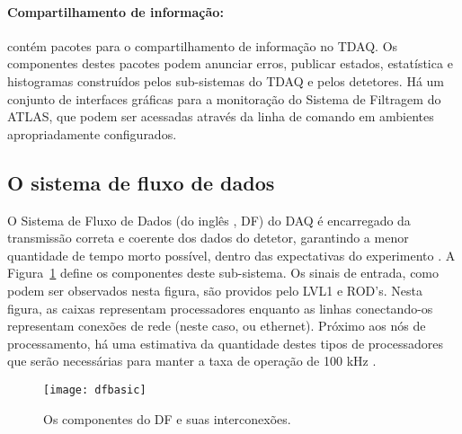 \paragraph{Compartilhamento de informação:} contém pacotes para o
compartilhamento de informação no TDAQ. Os componentes destes pacotes podem
anunciar erros, publicar estados, estatística e histogramas construídos pelos
sub-sistemas do TDAQ e pelos detetores. Há um conjunto de interfaces gráficas
para a monitoração do Sistema de Filtragem do ATLAS, que podem ser acessadas
através da linha de comando em ambientes apropriadamente configurados.



\subsection{O sistema de fluxo de dados}
\label{sec:dataflow}

O Sistema de Fluxo de Dados (do inglês , DF) do DAQ é
encarregado da transmissão correta e coerente dos dados do detetor, garantindo
a menor quantidade de tempo morto possível, dentro das expectativas do
experimento \cite{aa:chep-2003-2, aa:rt-2003, aa:tns-2004-3}. A
Figura~\ref{fig:dfbasic} define os componentes deste sub-sistema. Os sinais de
entrada, como podem ser observados nesta figura, são providos pelo LVL1 e
ROD's. Nesta figura, as caixas representam processadores enquanto as linhas
conectando-os representam conexões de rede (neste caso,  ou
 ethernet). Próximo aos nós de processamento, há uma
estimativa da quantidade destes tipos de processadores que serão necessárias
para manter a taxa de operação de 100 kHz \cite{hlt-tdr}.

\begin{figure}
\begin{center}
\texttt{[image: dfbasic]}
\end{center}
\caption{Os componentes do DF e suas interconexões.}
\label{fig:dfbasic}
\end{figure}

